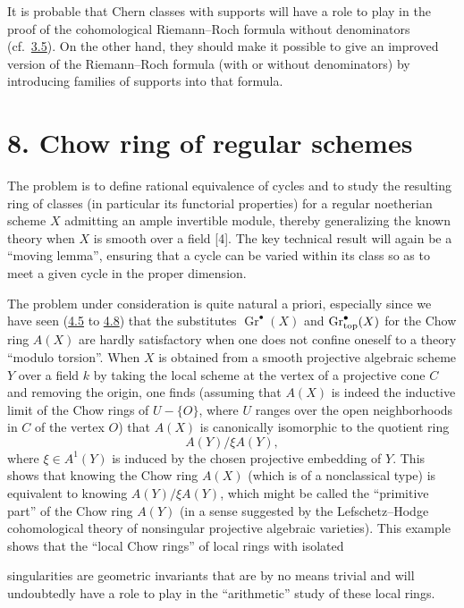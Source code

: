 It is probable that Chern classes with supports will have a role to play in
the proof of the cohomological Riemann--Roch formula without denominators
(cf.~\hyperlink{sga6.e14.para.3-5}{3.5}). On the other hand, they should make it possible to give an
improved version of the Riemann--Roch formula (with or without denominators)
by introducing families of supports into that formula.

\section*{8. Chow ring of regular schemes}

The problem is to define rational equivalence of cycles and to study the
resulting ring of classes (in particular its functorial properties) for a
regular noetherian scheme $X$ admitting an ample invertible module, thereby
generalizing the known theory when $X$ is smooth over a field [4]. The key
technical result will again be a ``moving lemma'', ensuring that a cycle can
be varied within its class so as to meet a given cycle in the proper
dimension.

The problem under consideration is quite natural a priori, especially since
we have seen (\hyperlink{sga6.e14.para.4-5}{4.5} to \hyperlink{sga6.e14.para.4-8}{4.8}) that the substitutes
$\operatorname{Gr}^\bullet(X)$ and $\operatorname{Gr}_{\mathrm{top}}^\bullet(X)$ for the Chow ring
$A(X)$ are hardly satisfactory when one does not confine oneself to a theory
``modulo torsion''. When $X$ is obtained from a smooth projective algebraic
scheme $Y$ over a field $k$ by taking the local scheme at the vertex of a
projective cone $C$ and removing the origin, one finds (assuming that $A(X)$
is indeed the inductive limit of the Chow rings of $U-\{O\}$, where $U$
ranges over the open neighborhoods in $C$ of the vertex $O$) that $A(X)$ is
canonically isomorphic to the quotient ring
\[
 A(Y)/\xi A(Y),
\]
where $\xi\in A^1(Y)$ is induced by the chosen projective embedding of $Y$.
This shows that knowing the Chow ring $A(X)$ (which is of a nonclassical
type) is equivalent to knowing $A(Y)/\xi A(Y)$, which might be called the
``primitive part'' of the Chow ring $A(Y)$ (in a sense suggested by the
Lefschetz--Hodge cohomological theory of nonsingular projective algebraic
varieties). This example shows that the ``local Chow rings'' of local rings
with isolated

singularities are geometric invariants that are by no means trivial and will
undoubtedly have a role to play in the ``arithmetic'' study of these local
rings.

